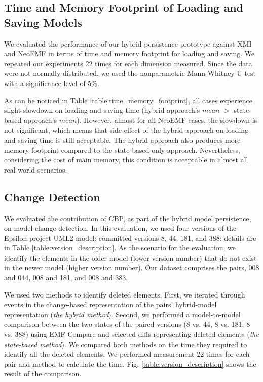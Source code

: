 \documentclass{llncs}
\begin{document}
\subsection{Time and Memory Footprint of Loading and Saving Models}
\label{sec:model_loading_time}

\vspace{-10pt}
We evaluated the performance of our hybrid persistence prototype against XMI and NeoEMF in terms of time and memory footprint for loading and saving. We repeated our experiments 22 times for each dimension measured. Since the data were not normally distributed, we used the nonparametric Mann-Whitney U test \cite{doi:10.1002/9780470479216.corpsy0524} with a significance level of 5\%. 

As can be noticed in Table \ref{table:time_memory_footprint}, all cases experience slight slowdown on loading and saving time (hybrid approach's $mean$ $>$ state-based approach's $mean$). However, almost for all NeoEMF cases, the slowdown is not significant, which means that side-effect of the hybrid approach on loading and saving time is still acceptable. The hybrid approach also produces more memory footprint compared to the state-based-only approach. Nevertheless, considering the cost of main memory, this condition is acceptable in almost all real-world scenarios.  

\vspace{-10pt}
\subsection{Change Detection}
\label{sec:change_detection}

\vspace{-5pt}
We evaluated the contribution of CBP, as part of the hybrid model persistence, on model change detection. In this evaluation, we used four versions of the Epsilon project UML2 model: committed versions 8, 44, 181, and 388: details are in Table \ref{table:version_description}. As the scenario for the evaluation, we identify the elements in the older model (lower version number) that do not exist in the newer model (higher version number). Our dataset comprises the pairs, 008 and 044, 008 and 181, and 008 and 383.

We used two methods to identify deleted elements. First, we iterated through events in the change-based representation of the pairs' hybrid-model representation (\emph{the hybrid method}). Second, we performed a model-to-model comparison between the two states of the paired versions (8 vs. 44, 8 vs. 181, 8 vs. 388) using EMF Compare and selected diffs representing deleted elements (\emph{the state-based method}). We compared both methods on the time they required to identify all the deleted elements. We performed measurement 22 times for each pair and method to calculate the time. Fig. \ref{table:version_description} shows the result of the comparison. 
\end{document}
